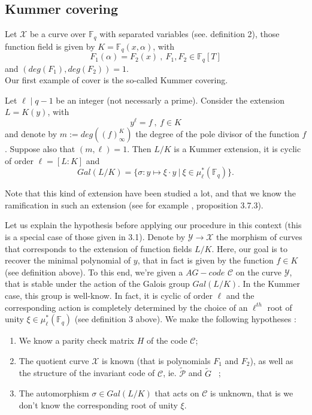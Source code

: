 \documentclass[10pt]{article}
\newcommand{\s}{\vspace{0.3cm}}
\newcommand{\cd}{\cdot}
\newcommand{\fq}{\mathbb{F}_q}
\newcommand{\X}{\mathcal{X}}
\newcommand{\Y}{\mathcal{Y}}
\newcommand{\PR}{\mathcal{P}}
\begin{document}
\s

\subsection{Kummer covering}

\s

Let $\X$ be a curve over $\fq$ with separated variables (see. definition 2), those function field is given by $K=\fq(x,\alpha)$, with
\[F_1(\alpha) = F_2(x) \ , \ F_1,F_2 \in \fq[T] \]
and $(deg(F_1),deg(F_2))=1$.  \\
Our first example of cover is the so-called Kummer covering.

\s

Let $\ell \mid q-1$ be an integer (not necessarly a prime). Consider the extension $L=K(y)$, with
\[y^{\ell} = f \ , \ f \in K\]
and denote by $m:=deg((f)_{\infty}^K)$ the degree of the pole divisor of the function $f$. Suppose also that $(m,\ell)=1$. Then $L/K$ is a Kummer extension, it is cyclic of order $\ell=[L:K]$ and 
\[Gal(L/K) = \{ \sigma : y \mapsto \xi \cd y \ | \ \xi \in \mu^*_{\ell}(\fq)\}.\] 

\s

Note that this kind of extension have been studied a lot, and that we know the ramification in such an extension (see for example \cite{Sti}, proposition 3.7.3).

Let us explain the hypothesis before applying our procedure in this context (this is a special case of those given in 3.1). Denote by $\Y \rightarrow \X$ the morphism of curves that corresponds to the extension of function fields $L/K$. Here, our goal is to recover the minimal polynomial of $y$, that in fact is given by the function $f \in K$ (see definition above). To this end, we're given a $AG-code$ $\mathcal{C}$ on the curve $\Y$, that is stable under the action of the Galois group $Gal(L/K)$. In the Kummer case, this group is well-know. In fact, it is cyclic of order $\ell$ and the corresponding action is completely determined by the choice of an $\ell^{th}$ root of unity $\xi \in \mu^*_{\ell}(\fq)$ (see definition 3 above). We make the following hypotheses :

\s

\begin{enumerate}
\item We know a parity check matrix $H$ of the code $\mathcal{C}$;
\item The quotient curve $\X$ is known (that is polynomials $F_1$ and $F_2$), as well as the structure of the invariant code of $\mathcal{C}$, ie. $\tilde{\PR}$ and $\tilde{G}$ \ ;
\item The automorphism $\sigma \in Gal(L/K)$ that acts on $\mathcal{C}$ is unknown, that is we don't know the corresponding root of unity $\xi$.
\end{enumerate}
\end{document}
